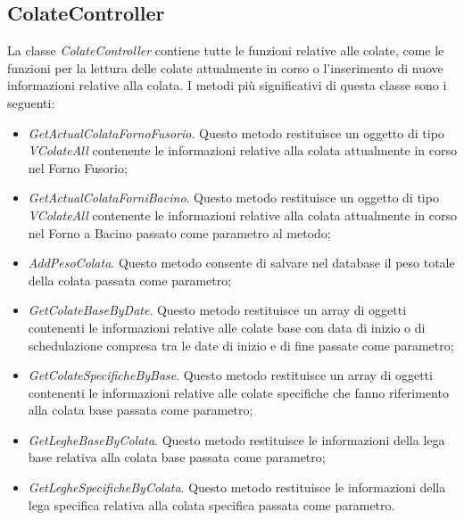   \subsection{ColateController}
  La classe \textit{ColateController} contiene tutte le funzioni relative alle colate, come le funzioni per la lettura delle
  colate attualmente in corso o l'inserimento di nuove informazioni relative alla colata. I metodi più significativi
  di questa classe sono i seguenti:
  \begin{itemize}
    \item \textit{GetActualColataFornoFusorio}. Questo metodo restituisce un oggetto di tipo \textit{VColateAll}
    contenente le informazioni relative alla colata attualmente in corso nel Forno Fusorio;
    \item \textit{GetActualColataForniBacino}. Questo metodo restituisce un oggetto di tipo \textit{VColateAll}
    contenente le informazioni relative alla colata attualmente in corso nel Forno a Bacino passato come parametro al metodo;
    \item \textit{AddPesoColata}. Questo metodo consente di salvare nel database il peso totale della colata passata
    come parametro;
    \item \textit{GetColateBaseByDate}. Questo metodo restituisce un array di oggetti contenenti le informazioni relative
    alle colate base con data di inizio o di schedulazione compresa tra le date di inizio e di fine passate come parametro;
    \item \textit{GetColateSpecificheByBase}. Questo metodo restituisce un array di oggetti contenenti le informazioni
    relative alle colate specifiche che fanno riferimento alla colata base passata come parametro;
    \item \textit{GetLegheBaseByColata}. Questo metodo restituisce le informazioni della lega base relativa alla
    colata base passata come parametro;
    \item \textit{GetLegheSpecificheByColata}. Questo metodo restituisce le informazioni della lega specifica relativa
    alla colata specifica passata come parametro.
  \end{itemize}

